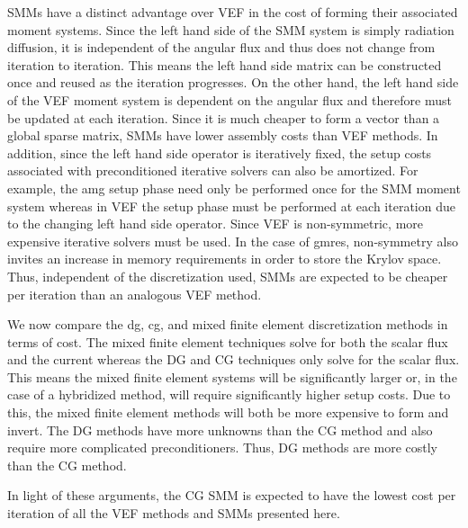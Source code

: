 \documentclass[../doc.tex]{subfiles}
\begin{document}
SMMs have a distinct advantage over VEF in the cost of forming their associated moment systems. Since the left hand side of the SMM system is simply radiation diffusion, it is independent of the angular flux and thus does not change from iteration to iteration. This means the left hand side matrix can be constructed once and reused as the iteration progresses. On the other hand, the left hand side of the VEF moment system is dependent on the angular flux and therefore must be updated at each iteration. Since it is much cheaper to form a vector than a global sparse matrix, SMMs have lower assembly costs than VEF methods. In addition, since the left hand side operator is iteratively fixed, the setup costs associated with preconditioned iterative solvers can also be amortized. For example, the \gls{amg} setup phase need only be performed once for the SMM moment system whereas in VEF the setup phase must be performed at each iteration due to the changing left hand side operator. 
Since VEF is non-symmetric, more expensive iterative solvers must be used. In the case of \gls{gmres}, non-symmetry also invites an increase in memory requirements in order to store the Krylov space. Thus, independent of the discretization used, SMMs are expected to be cheaper per iteration than an analogous VEF method. 

We now compare the \gls{dg}, \gls{cg}, and mixed finite element discretization methods in terms of cost. The mixed finite element techniques solve for both the scalar flux and the current whereas the DG and CG techniques only solve for the scalar flux. This means the mixed finite element systems will be significantly larger or, in the case of a hybridized method, will require significantly higher setup costs. Due to this, the mixed finite element methods will both be more expensive to form and invert. The DG methods have more unknowns than the CG method and also require more complicated preconditioners. Thus, DG methods are more costly than the CG method. 

In light of these arguments, the CG SMM is expected to have the lowest cost per iteration of all the VEF methods and SMMs presented here. 
\end{document}
